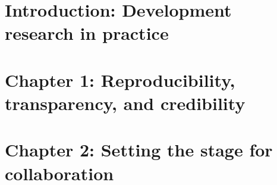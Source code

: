 %
%
%
%




\cleardoublepage
\chapter{Introduction: Development research in practice}





\chapter{Chapter 1: Reproducibility, transparency, and credibility}
\label{ch:1}




\chapter{Chapter 2: Setting the stage for collaboration}
\label{ch:2}





